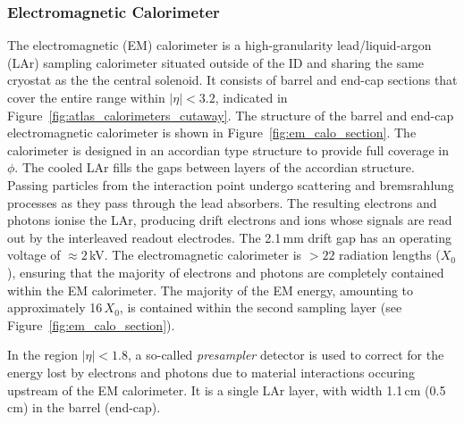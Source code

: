 \subsubsection{Electromagnetic Calorimeter}
\label{sec:calo_em}

The electromagnetic (EM) calorimeter is a high-granularity lead/liquid-argon (LAr)
sampling calorimeter situated outside of the ID and sharing the
same cryostat as the the central solenoid.
It consists of barrel and end-cap sections that cover the entire
range within $\lvert \eta \rvert < 3.2$, indicated in Figure~\ref{fig:atlas_calorimeters_cutaway}.
The structure of the barrel and end-cap electromagnetic calorimeter
is shown in Figure~\ref{fig:em_calo_section}.
The calorimeter is designed in an accordian type structure to provide full coverage
in $\phi$.
The cooled LAr fills the gaps between layers of the
accordian structure.
Passing particles from the interaction point undergo scattering and bremsrahlung processes as they pass through
the lead absorbers. The resulting electrons and photons ionise the LAr, producing
drift electrons and ions whose signals are read out by the interleaved readout
electrodes. The 2.1\,mm drift gap has an operating voltage of $\approx 2$\,kV.
The electromagnetic calorimeter is $>22$ radiation lengths ($X_0$), ensuring
that the majority of electrons and photons are completely contained within the EM calorimeter.
The majority of the EM energy, amounting to approximately 16\,$X_0$, is contained
within the second sampling layer (see Figure~\ref{fig:em_calo_section}).

In the region $\lvert \eta \rvert < 1.8$, a so-called \textit{presampler} detector is used to correct
for the energy lost by electrons and photons due to material interactions occuring
upstream of the EM calorimeter.
It is a single LAr layer, with width 1.1\,cm (0.5\,cm) in the barrel (end-cap).

